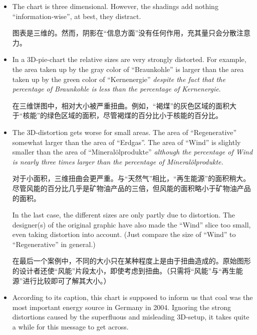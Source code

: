 %
\begin{itemize}
    \item The chart is three dimensional. However, the shadings add nothing
        ``information-wise'', at best, they distract.

        图表是三维的。然而，阴影在“信息方面”没有任何作用，充其量只会分散注意力。

    \item In a 3D-pie-chart the relative sizes are very strongly distorted.
        For example, the area taken up by the gray color of ``Braunkohle'' is
        larger than the area taken up by the green color of ``Kernenergie''
        \emph{despite the fact that the percentage of Braunkohle is less than
        the percentage of Kernenergie}.

        在三维饼图中，相对大小被严重扭曲。例如，“褐煤”的灰色区域的面积大于“核能”的绿色区域的面积，尽管褐煤的百分比小于核能的百分比。


    \item The 3D-distortion gets worse for small areas. The area of
        ``Regenerative'' somewhat larger  than the area of ``Erdgas''. The
        area of ``Wind'' is slightly smaller than the area of
        ``Mineral\"olprodukte'' \emph{although the percentage of Wind is
        nearly three times larger than the percentage of
        Mineral\"olprodukte.}

        对于小面积，三维扭曲会更严重。与“天然气”相比，“再生能源”的面积稍大。尽管风能的百分比几乎是矿物油产品的三倍，但风能的面积略小于矿物油产品的面积。



        In the last case, the different sizes are only partly due to
        distortion. The designer(s) of the original graphic have also made
        the ``Wind'' slice too small, even taking distortion into
        account. (Just compare the size of ``Wind'' to ``Regenerative'' in
        general.)

        在最后一个案例中，不同的大小只在某种程度上是由于扭曲造成的。原始图形的设计者还使“风能”片段太小，即使考虑到扭曲。（只需将“风能”与“再生能源”进行比较即可了解其大小。）


    \item According to its caption, this chart is supposed to inform us that
        coal was the most important energy source in Germany in 2004.
        Ignoring the strong distortions caused by the superfluous and
        misleading 3D-setup, it takes quite a while for this message to get
        across.


\end{itemize}
